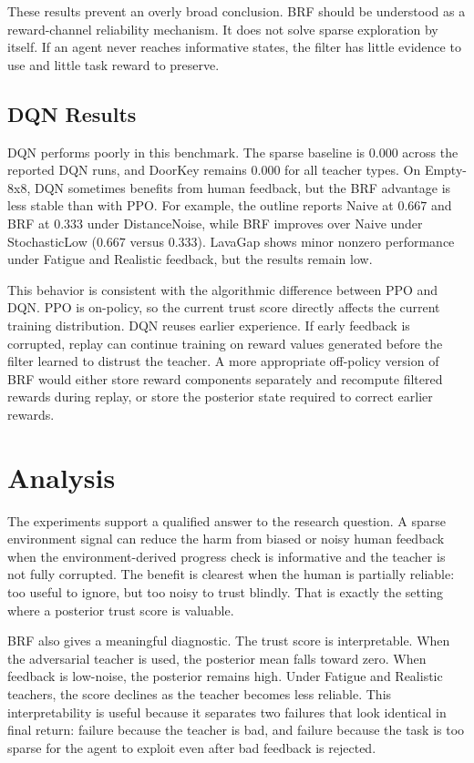\documentclass[11pt]{article}
\begin{document}
These results prevent an overly broad conclusion. BRF should be understood as a reward-channel reliability mechanism. It does not solve sparse exploration by itself. If an agent never reaches informative states, the filter has little evidence to use and little task reward to preserve.

\subsection{DQN Results}

DQN performs poorly in this benchmark. The sparse baseline is $0.000$ across the reported DQN runs, and DoorKey remains $0.000$ for all teacher types. On Empty-8x8, DQN sometimes benefits from human feedback, but the BRF advantage is less stable than with PPO. For example, the outline reports Naive at $0.667$ and BRF at $0.333$ under DistanceNoise, while BRF improves over Naive under StochasticLow ($0.667$ versus $0.333$). LavaGap shows minor nonzero performance under Fatigue and Realistic feedback, but the results remain low.

This behavior is consistent with the algorithmic difference between PPO and DQN. PPO is on-policy, so the current trust score directly affects the current training distribution. DQN reuses earlier experience. If early feedback is corrupted, replay can continue training on reward values generated before the filter learned to distrust the teacher. A more appropriate off-policy version of BRF would either store reward components separately and recompute filtered rewards during replay, or store the posterior state required to correct earlier rewards.

\section{Analysis}

The experiments support a qualified answer to the research question. A sparse environment signal can reduce the harm from biased or noisy human feedback when the environment-derived progress check is informative and the teacher is not fully corrupted. The benefit is clearest when the human is partially reliable: too useful to ignore, but too noisy to trust blindly. That is exactly the setting where a posterior trust score is valuable.

BRF also gives a meaningful diagnostic. The trust score is interpretable. When the adversarial teacher is used, the posterior mean falls toward zero. When feedback is low-noise, the posterior remains high. Under Fatigue and Realistic teachers, the score declines as the teacher becomes less reliable. This interpretability is useful because it separates two failures that look identical in final return: failure because the teacher is bad, and failure because the task is too sparse for the agent to exploit even after bad feedback is rejected.
\end{document}
